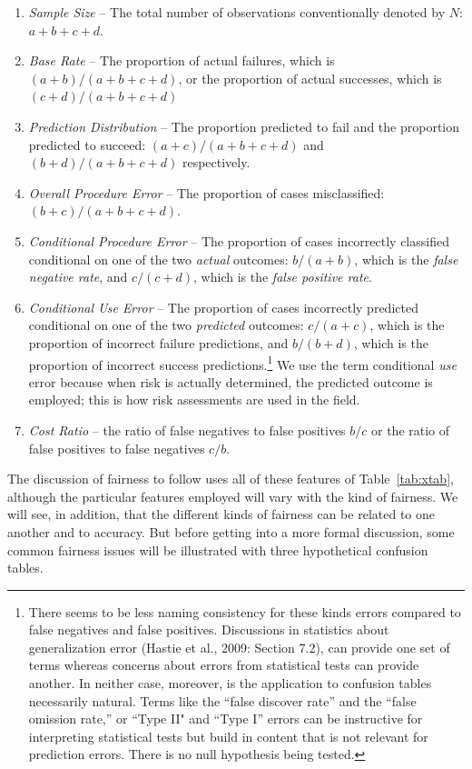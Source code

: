 \documentclass[12pt]{article}
\begin{document}
\begin{enumerate}
\item
\textit{Sample Size} -- The total number of observations conventionally denoted by $N$: $a + b + c + d$.
\item
\textit{Base Rate} -- The proportion of actual failures, which is $(a+b)/(a+b+c+d)$, or the proportion of actual successes, which is $(c+d)/(a+b+c+d)$
\item
\textit{Prediction Distribution} -- The proportion predicted to fail and the proportion predicted to succeed: $(a+c)/(a+b+c+d)$ and $(b+d)/(a+b+c+d)$ respectively.
\item
\textit{Overall Procedure Error} -- The proportion of cases misclassified: $(b+c)/(a+b+c+d)$.
 \item
\textit{Conditional Procedure Error} -- The proportion of cases  incorrectly classified conditional on one of the two \textit{actual} outcomes: $b/(a+b)$, which is the \textit{false negative rate}, and $c/(c+d)$, which is the \textit{false positive rate}.
\item
\textit{Conditional Use Error} -- The proportion of cases incorrectly predicted conditional on one of the two \textit{predicted} outcomes: $c/(a+c)$, which is the proportion of incorrect failure predictions, and  $b/(b+d)$, which is the proportion of incorrect success predictions.\footnote
{
 There seems to be less naming consistency for these kinds errors compared to false negatives and false positives.  Discussions in statistics about generalization error (Hastie et al., 2009: Section 7.2), can provide one set of terms whereas concerns about errors from statistical tests can provide another. In neither case, moreover, is the application to confusion tables necessarily natural. Terms like the ``false discover rate''  and the ``false omission rate,'' or  ``Type II" and ``Type I'' errors can be instructive for interpreting statistical tests but build in content that is not relevant for prediction errors. There is no null hypothesis being tested. 
 }
We use the term conditional \textit{use} error because when risk is actually determined, the predicted outcome is employed; this is how risk assessments are used in the field. 
\item
\textit{Cost Ratio} -- the ratio of false negatives to false positives $b/c$ or the ratio of false positives to false negatives $c/b$.
\end{enumerate}

The discussion of fairness to follow uses all of these features of Table~\ref{tab:xtab}, although the particular features employed will vary with the kind of fairness. We will see, in addition, that the different kinds of fairness can be related to one another and to accuracy. But before getting into a more formal discussion, some common fairness issues will be illustrated with three hypothetical confusion tables.
\end{document}
